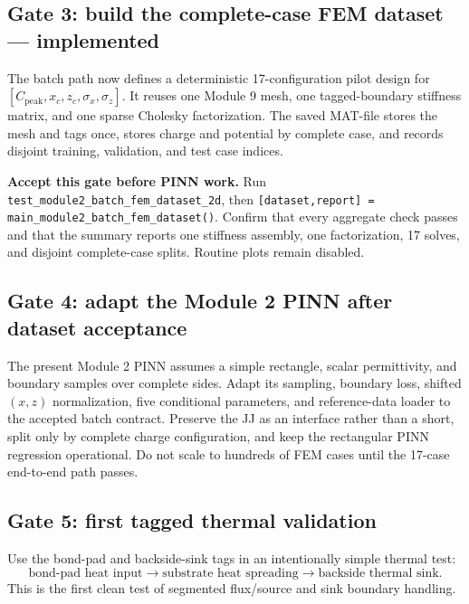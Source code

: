 \documentclass[11pt]{article}
\begin{document}
\subsection{Gate 3: build the complete-case FEM dataset --- implemented}

The batch path now defines a deterministic 17-configuration pilot design for
$[C_{\mathrm{peak}},x_c,z_c,\sigma_x,\sigma_z]$. It reuses one Module 9 mesh, one tagged-boundary stiffness matrix, and one sparse Cholesky factorization. The saved MAT-file stores the mesh and tags once, stores charge and potential by complete case, and records disjoint training, validation, and test case indices.

\begin{notebox}
\textbf{Accept this gate before PINN work.} Run \texttt{test\_module2\_batch\_fem\_dataset\_2d}, then \texttt{[dataset,report] = main\_module2\_batch\_fem\_dataset()}. Confirm that every aggregate check passes and that the summary reports one stiffness assembly, one factorization, 17 solves, and disjoint complete-case splits. Routine plots remain disabled.
\end{notebox}

\subsection{Gate 4: adapt the Module 2 PINN after dataset acceptance}

The present Module 2 PINN assumes a simple rectangle, scalar permittivity, and boundary samples over complete sides. Adapt its sampling, boundary loss, shifted $(x,z)$ normalization, five conditional parameters, and reference-data loader to the accepted batch contract. Preserve the JJ as an interface rather than a short, split only by complete charge configuration, and keep the rectangular PINN regression operational. Do not scale to hundreds of FEM cases until the 17-case end-to-end path passes.

\subsection{Gate 5: first tagged thermal validation}

Use the bond-pad and backside-sink tags in an intentionally simple thermal test:
\begin{equation}
\text{bond-pad heat input}
\longrightarrow
\text{substrate heat spreading}
\longrightarrow
\text{backside thermal sink}.
\end{equation}
This is the first clean test of segmented flux/source and sink boundary handling.
\end{document}
